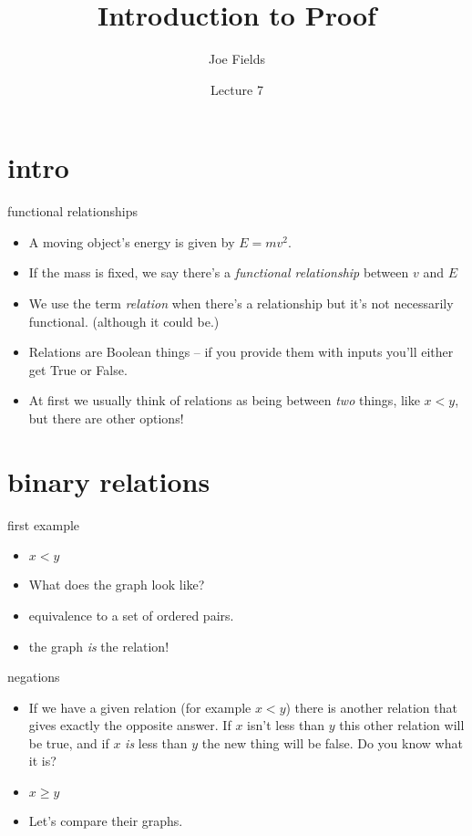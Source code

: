 \documentclass[landscape]{beamer}
\author{Joe Fields}
\title{Introduction to Proof}
\date{Lecture 7}
\institute[SCSU]{ {\tt fieldsj1@southernct.edu} }
\begin{document}
\begin{frame}[plain]
  \titlepage
\end{frame}


\section{intro}

\begin{frame}{functional relationships}
\begin{itemize}
\item A moving object's energy is given by $E=mv^2$.\pause
\item If the mass is fixed, we say there's a {\em functional relationship} between $v$ and $E$\pause
\item We use the term {\em relation} when there's a relationship but it's not necessarily functional. \pause (although it could be.) \pause
\item Relations are Boolean things -- if you provide them with inputs you'll either get True or False. \pause
\item At first we usually think of relations as being between {\em two} things, like $x<y$, but there are other options!
\end{itemize}
\end{frame}

\section{binary relations}

\begin{frame}{first example}
\begin{itemize}
\item $x < y$ \pause
\item What does the graph look like? \pause
\item equivalence to a set of ordered pairs. \pause
\item the graph {\em is} the relation! \pause 
\end{itemize}
\end{frame}

\begin{frame}{negations}
\begin{itemize}
\item If we have a given relation (for example $x < y$) there is another relation that gives exactly the opposite answer.  If $x$ isn't less than $y$ this other relation will be true, and if $x$ {\em is} less than $y$ the new thing will be false.  Do you know what it is? \pause
\item $x \geq y$ \pause
\item Let's compare their graphs.
\end{itemize}
\end{frame}
\end{document}
